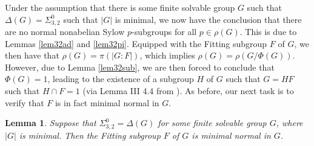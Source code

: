 \documentclass[11pt]{amsart}
\newtheorem{lemma}[theorem]{Lemma}
\theoremstyle{definition}
\theoremstyle{remark}
\numberwithin{equation}{section}
\newcommand{\SZ}[2]{\Sigma_{#1,#2}^0} %
\begin{document}
Under the assumption that there is some finite solvable group $G$ such that $\Delta(G)=\SZ{3}{2}$ such that $|G|$ is minimal, we now have the conclusion that there are no normal nonabelian Sylow $p$-subgroups for all $p\in\rho(G)$. This is due to Lemmas \ref{lem32ad} and \ref{lem32pi}. Equipped with the Fitting subgroup $F$ of $G$, we then have that $\rho(G)=\pi(|G:F|)$, which implies $\rho(G)=\rho(G/\Phi(G))$. However, due to Lemma \ref{lem32sub}, we are then forced to conclude that $\Phi(G)=1$, leading to the existence of a subgroup $H$ of $G$ such that $G=HF$ such that $H\cap F=1$ (via Lemma III 4.4 from \cite{H}). As before, our next task is to verify that $F$ is in fact minimal normal in $G$.

\begin{lemma}\label{lem32min}
Suppose that $\SZ{3}{2}=\Delta(G)$ for some finite solvable group $G$, where $|G|$ is minimal. Then the Fitting subgroup $F$ of $G$ is minimal normal in $G$.
\end{lemma}
\end{document}
